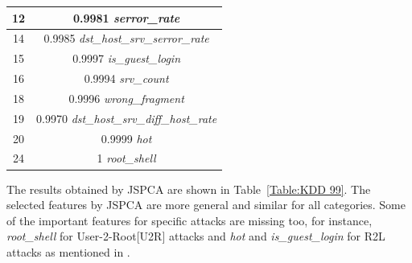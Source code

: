 \begin{table}
\begin{tabular}{|c|c|}
12    & 0.9981 \emph{serror\_rate}                                                                                                          \\ \hline
14    & 0.9985 \emph{dst\_host\_srv\_serror\_rate}                                                                                          \\ \hline
15    & 0.9997 \emph{is\_guest\_login}                                                                                                      \\ \hline
16    & 0.9994 \emph{srv\_count}                                                                                                            \\ \hline
18    & 0.9996 \emph{wrong\_fragment}                                                                                                       \\ \hline
19    & 0.9970 \emph{dst\_host\_srv\_diff\_host\_rate}                                                                                      \\ \hline
20    & 0.9999 \emph{hot}                                                                                                                   \\ \hline
24    & 1 \emph{root\_shell}                                                                                                                \\ \hline
	\end{tabular}
\end{table}


The results obtained by JSPCA are shown in Table~\ref{Table:KDD 99}. The selected features by JSPCA are more general and similar for all categories. Some of the important features for specific attacks are missing too, for instance, \emph{root\_shell} for User-2-Root[U2R] attacks and \emph{hot} and \emph{is\_guest\_login} for R2L attacks as mentioned in \cite{sabhnani2003kdd}.

